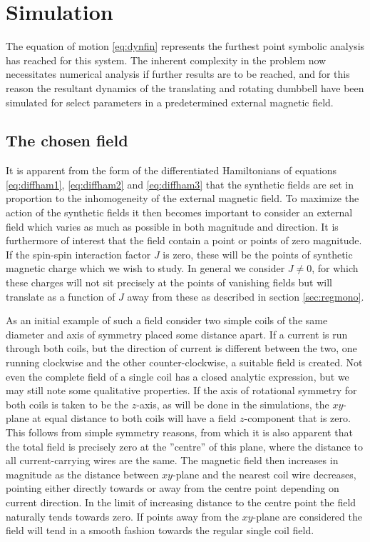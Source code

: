 \documentclass[main.tex]{subfiles}
\begin{document}
\section{Simulation}\label{sec:simulation}
The equation of motion \ref{eq:dynfin} represents the furthest point symbolic analysis has
reached for this system. The inherent complexity in the problem now necessitates numerical
analysis if further results are to be reached, and for this reason the resultant dynamics
of the translating and rotating dumbbell have been simulated for select parameters in a predetermined external magnetic field.

\subsection{The chosen field}\label{sec:chofield}
It is apparent from the form of the differentiated Hamiltonians of equations
\ref{eq:diffham1}, \ref{eq:diffham2} and \ref{eq:diffham3} that the synthetic fields are
set in proportion to the inhomogeneity of the external magnetic field. To maximize the
action of the synthetic fields it then becomes important to consider an external field
which varies as much as possible in both magnitude and direction. It is furthermore of
interest that the field contain a point or points of zero magnitude. If the spin-spin
interaction factor \(J\) is zero, these will be the points of synthetic magnetic charge
which we wish to study. In general we consider \(J \ne 0\), for which these charges will
not sit precisely at the points of vanishing fields but will translate as a function of
\(J\) away from these as described in section \ref{sec:regmono}.

As an initial example of such a field consider two simple coils of the same diameter and
axis of symmetry placed some distance apart. If a current is run through both coils, but
the direction of current is different between the two, one running clockwise and the other
counter-clockwise, a suitable field is created. Not even the complete field of a single
coil has a closed analytic expression, but we may still note some qualitative properties.
If the axis of rotational symmetry for both coils is taken to be the \(z\)-axis, as will be
done in the simulations, the \(xy\)-plane at equal distance to both coils will have a field
\(z\)-component that is zero. This follows from simple symmetry reasons, from which it is
also apparent that the total field is precisely zero at the ''centre'' of this plane, where
the distance to all current-carrying wires are the same. The magnetic field then increases
in magnitude as the distance between \(xy\)-plane and the nearest coil wire decreases,
pointing either directly towards or away from the centre point depending on current
direction. In the limit of increasing distance to the centre point the field naturally
tends towards zero. If points away from the \(xy\)-plane are considered the field will tend
in a smooth fashion towards the regular single coil field.
\end{document}
